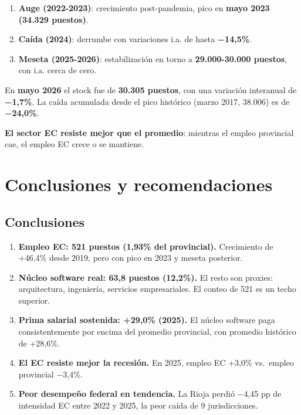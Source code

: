 \documentclass[
  spanish,
  letterpaper,
  DIV=11,
  numbers=noendperiod]{scrartcl}
\providecommand{\tightlist}{%
  \setlength{\itemsep}{0pt}\setlength{\parskip}{0pt}}
\begin{document}
\begin{enumerate}
\def\labelenumi{\arabic{enumi}.}
\tightlist
\item
  \textbf{Auge (2022-2023)}: crecimiento post-pandemia, pico en
  \textbf{mayo 2023 (34.329 puestos)}.
\item
  \textbf{Caída (2024)}: derrumbe con variaciones i.a. de hasta
  \textbf{−14,5\%}.
\item
  \textbf{Meseta (2025-2026)}: estabilización en torno a
  \textbf{29.000-30.000 puestos}, con i.a. cerca de cero.
\end{enumerate}

En \textbf{mayo 2026} el stock fue de \textbf{30.305 puestos}, con una
variación interanual de \textbf{−1,7\%}. La caída acumulada desde el
pico histórico (marzo 2017, 38.006) es de \textbf{−24,0\%}.

\textbf{El sector EC resiste mejor que el promedio}: mientras el empleo
provincial cae, el empleo EC crece o se mantiene.

\section{Conclusiones y recomendaciones}\label{sec-conclusiones}

\subsection{Conclusiones}\label{conclusiones}

\begin{enumerate}
\def\labelenumi{\arabic{enumi}.}
\item
  \textbf{Empleo EC: 521 puestos (1,93\% del provincial).} Crecimiento
  de +46,4\% desde 2019, pero con pico en 2023 y meseta posterior.
\item
  \textbf{Núcleo software real: 63,8 puestos (12,2\%).} El resto son
  proxies: arquitectura, ingeniería, servicios empresariales. El conteo
  de 521 es un techo superior.
\item
  \textbf{Prima salarial sostenida: +29,0\% (2025).} El núcleo software
  paga consistentemente por encima del promedio provincial, con promedio
  histórico de +28,6\%.
\item
  \textbf{El EC resiste mejor la recesión.} En 2025, empleo EC +3,0\%
  vs.~empleo provincial −3,4\%.
\item
  \textbf{Peor desempeño federal en tendencia.} La Rioja perdió −4,45 pp
  de intensidad EC entre 2022 y 2025, la peor caída de 9 jurisdicciones.
\end{enumerate}
\end{document}
